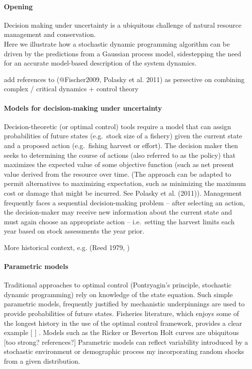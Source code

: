 \documentclass[author-year, review]{elsarticle} %
\begin{document}
\paragraph{Opening}

Decision making under uncertainty is a ubiquitous challenge of natural
resource management and conservation.\\Here we illustrate how a
stochastic dynamic programming algorithm can be driven by the
predictions from a Gaussian process model, sidestepping the need for an
accurate model-based description of the system dynamics.

add references to (@Fischer2009, Polasky et al. 2011) as persective on
combining complex / critical dynamics + control theory

\paragraph{Models for decision-making under uncertainty}

Decision-theoretic (or optimal control) tools require a model that can
assign probabilities of future states (e.g.~stock size of a fishery)
given the current state and a proposed action (e.g.~fishing harvest or
effort). The decision maker then seeks to determining the course of
actions (also referred to as the policy) that maximizes the expected
value of some objective function (such as net present value derived from
the resource over time. (The approach can be adapted to permit
alternatives to maximizing expectation, such as minimizing the maximum
cost or damage that might be incurred. See Polasky et al. (2011)).
Management frequently faces a sequential decision-making problem --
after selecting an action, the decision-maker may receive new
information about the current state and must again choose an appropriate
action -- i.e.~setting the harvest limits each year based on stock
assessments the year prior.

More historical context, e.g. (Reed 1979, )

\paragraph{Parametric models}

Traditional approaches to optimal control (Pontryagin's principle,
stochastic dynamic programming) rely on knowledge of the state equation.
Such simple parametric models, frequently justified by mechanistic
underpinnings are used to provide probabilities of future states.
Fisheries literature, which enjoys some of the longest history in the
use of the optimal control framework, provides a clear example {[} {]} .
Models such as the Ricker or Beverton Holt curves are ubiquitous {[}too
strong? references?{]} Parametric models can reflect variability
introduced by a stochastic environment or demographic process my
incorporating random shocks from a given distribution.
\end{document}
